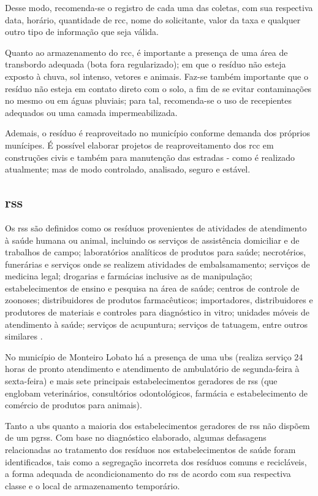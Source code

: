 	Desse modo, recomenda-se o registro de cada uma das coletas, com sua respectiva data, horário, quantidade de \gls{rcc}, nome do solicitante, valor da taxa e qualquer outro tipo de informação que seja válida.
	
	Quanto ao armazenamento do \gls{rcc}, é importante a presença de uma área de transbordo adequada (bota fora regularizado); em que o resíduo não esteja exposto à chuva, sol intenso, vetores e animais. Faz-se também importante que o resíduo não esteja em contato direto com o solo, a fim de se evitar contaminações no mesmo ou em águas pluviais; para tal, recomenda-se o uso de recepientes adequados ou uma camada impermeabilizada.
	
	Ademais, o resíduo é reaproveitado no município conforme demanda dos próprios munícipes. É possível elaborar projetos de reaproveitamento dos \gls{rcc} em construções civis e também para manutenção das estradas - como é realizado atualmente; mas de modo controlado, analisado, seguro e estável.
	
	\subsection{\gls{rss}}
	Os \gls{rss} são definidos como os resíduos provenientes de atividades de atendimento à saúde humana ou animal, incluindo os serviços de assistência domiciliar e de trabalhos de campo; laboratórios analíticos de produtos para saúde; necrotérios, funerárias e serviços onde se realizem atividades de embalsamamento; serviços de medicina legal; drogarias e farmácias inclusive as de manipulação; estabelecimentos de ensino e pesquisa na área de saúde; centros de controle de zoonoses; distribuidores de produtos farmacêuticos; importadores, distribuidores e produtores de materiais e controles para diagnóstico in vitro; unidades móveis de atendimento à saúde; serviços de acupuntura; serviços de tatuagem, entre outros similares \cite{conama:362}.
	
	No município de Monteiro Lobato há a presença de uma \gls{ubs} (realiza serviço 24 horas de pronto atendimento e atendimento de ambulatório de segunda-feira à sexta-feira) e mais sete principais estabelecimentos geradores de \gls{rss} (que englobam veterinários, consultórios odontológicos, farmácia e estabelecimento de comércio de produtos para animais). 
		
	Tanto a \gls{ubs} quanto a maioria dos estabelecimentos geradores de \gls{rss} não dispõem de um \gls{pgrss}. Com base no diagnóstico elaborado, algumas defasagens relacionadas ao tratamento dos resíduos nos estabelecimentos de saúde foram identificados, tais como a segregação incorreta dos resíduos comuns e recicláveis, a forma adequada de acondicionamento do \gls{rss} de acordo com sua respectiva classe e o local de armazenamento temporário.
	
